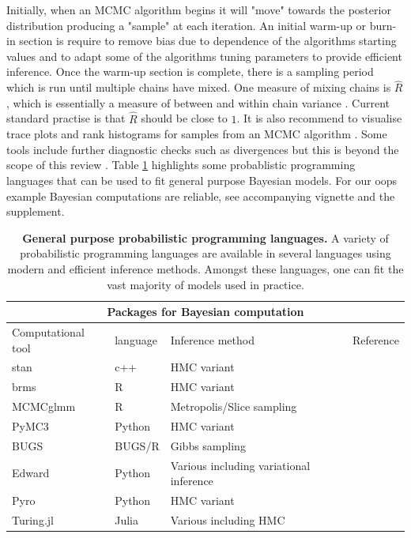 \documentclass[12pt,english, journal=jpr, layout=twocolumn]{article}
\begin{document}
Initially, when an MCMC algorithm begins it will "move" towards the posterior distribution producing a "sample" at each iteration. An initial warm-up or burn-in section is require to remove bias due to dependence of the algorithms starting values and to adapt some of the algorithms tuning parameters to provide efficient inference. Once the warm-up section is complete, there is a sampling period which is run until multiple chains have mixed. One measure of mixing chains is $\hat{R}$, which is essentially a measure of between and within chain variance \citep{Vehtari::2019}. Current standard practise is that $\hat{R}$ should be close to $1$. It is also recommend to visualise trace plots and rank histograms for samples from an MCMC algorithm \citep{Gabry::2019}. Some tools include further diagnostic checks such as divergences but this is beyond the scope of this review \citep{Betancourt::2017}. Table \ref{table::bayesian computation} highlights some probablistic programming languages that can be used to fit general purpose Bayesian models. For our oops example Bayesian computations are reliable, see accompanying vignette and the supplement.

\begin{table}[ht]
	\centering
	
	\begin{tabular}{ |p{3cm}||p{2cm}|p{7cm}|p{5cm}|  }
		\hline
		\multicolumn{4}{|c|}{Packages for Bayesian computation} \\
		\hline
		Computational tool & language & Inference method & Reference\\
		\hline
		stan   & c++   &HMC variant&   \citep{Carpenter::2017}\\
		brms &   R  & HMC variant   & \citep{Burkner::2017}\\
		MCMCglmm & R & Metropolis/Slice sampling &  \citep{Hadfield::2010}\\
		PyMC3    & Python & HMC variant&  \citep{Salvatier::2016}\\
		BUGS &   BUGS/R  & Gibbs sampling & \citep{Lunn::2009}\\
		Edward&  Python  & Various including variational inference   &\citep{Tran::2016}\\
		Pyro & Python & HMC variant& \citep{Bingham::2019}\\
		Turing.jl & Julia & Various including HMC & \citep{Ge::2018}\\
		\hline
	\end{tabular}
\caption{\textbf{General purpose probabilistic programming languages.} A variety of probabilistic programming languages are available in several languages using modern and efficient inference methods. Amongst these languages, one can fit the vast majority of models used in practice.}
\label{table::bayesian computation}
\end{table}
\end{document}
